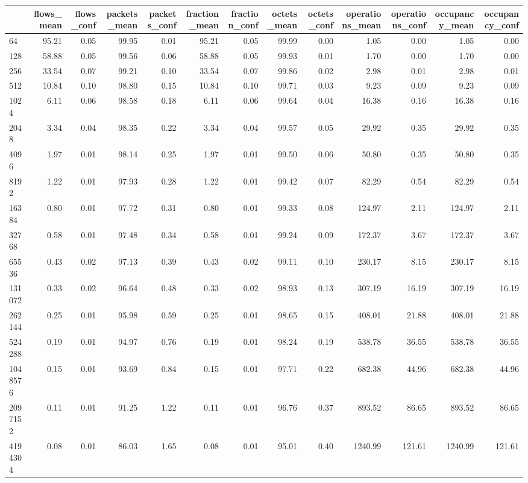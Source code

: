 \begin{tabular}{lrrrrrrrrrrrr}
\toprule
 & flows_mean & flows_conf & packets_mean & packets_conf & fraction_mean & fraction_conf & octets_mean & octets_conf & operations_mean & operations_conf & occupancy_mean & occupancy_conf \\
\midrule
64 & 95.21 & 0.05 & 99.95 & 0.01 & 95.21 & 0.05 & 99.99 & 0.00 & 1.05 & 0.00 & 1.05 & 0.00 \\
128 & 58.88 & 0.05 & 99.56 & 0.06 & 58.88 & 0.05 & 99.93 & 0.01 & 1.70 & 0.00 & 1.70 & 0.00 \\
256 & 33.54 & 0.07 & 99.21 & 0.10 & 33.54 & 0.07 & 99.86 & 0.02 & 2.98 & 0.01 & 2.98 & 0.01 \\
512 & 10.84 & 0.10 & 98.80 & 0.15 & 10.84 & 0.10 & 99.71 & 0.03 & 9.23 & 0.09 & 9.23 & 0.09 \\
1024 & 6.11 & 0.06 & 98.58 & 0.18 & 6.11 & 0.06 & 99.64 & 0.04 & 16.38 & 0.16 & 16.38 & 0.16 \\
2048 & 3.34 & 0.04 & 98.35 & 0.22 & 3.34 & 0.04 & 99.57 & 0.05 & 29.92 & 0.35 & 29.92 & 0.35 \\
4096 & 1.97 & 0.01 & 98.14 & 0.25 & 1.97 & 0.01 & 99.50 & 0.06 & 50.80 & 0.35 & 50.80 & 0.35 \\
8192 & 1.22 & 0.01 & 97.93 & 0.28 & 1.22 & 0.01 & 99.42 & 0.07 & 82.29 & 0.54 & 82.29 & 0.54 \\
16384 & 0.80 & 0.01 & 97.72 & 0.31 & 0.80 & 0.01 & 99.33 & 0.08 & 124.97 & 2.11 & 124.97 & 2.11 \\
32768 & 0.58 & 0.01 & 97.48 & 0.34 & 0.58 & 0.01 & 99.24 & 0.09 & 172.37 & 3.67 & 172.37 & 3.67 \\
65536 & 0.43 & 0.02 & 97.13 & 0.39 & 0.43 & 0.02 & 99.11 & 0.10 & 230.17 & 8.15 & 230.17 & 8.15 \\
131072 & 0.33 & 0.02 & 96.64 & 0.48 & 0.33 & 0.02 & 98.93 & 0.13 & 307.19 & 16.19 & 307.19 & 16.19 \\
262144 & 0.25 & 0.01 & 95.98 & 0.59 & 0.25 & 0.01 & 98.65 & 0.15 & 408.01 & 21.88 & 408.01 & 21.88 \\
524288 & 0.19 & 0.01 & 94.97 & 0.76 & 0.19 & 0.01 & 98.24 & 0.19 & 538.78 & 36.55 & 538.78 & 36.55 \\
1048576 & 0.15 & 0.01 & 93.69 & 0.84 & 0.15 & 0.01 & 97.71 & 0.22 & 682.38 & 44.96 & 682.38 & 44.96 \\
2097152 & 0.11 & 0.01 & 91.25 & 1.22 & 0.11 & 0.01 & 96.76 & 0.37 & 893.52 & 86.65 & 893.52 & 86.65 \\
4194304 & 0.08 & 0.01 & 86.03 & 1.65 & 0.08 & 0.01 & 95.01 & 0.40 & 1240.99 & 121.61 & 1240.99 & 121.61 \\

\end{tabular}
